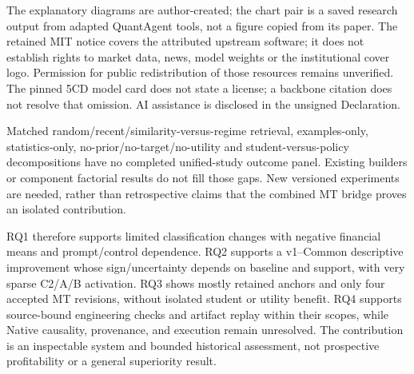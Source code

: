 The explanatory diagrams are author-created; the chart pair is a saved
research output from adapted QuantAgent tools, not a figure copied from
its paper. The retained MIT notice covers the attributed upstream
software; it does not establish rights to market data, news, model
weights or the institutional cover logo. Permission for public
redistribution of those resources remains unverified. The pinned 5CD
model card does not state a license; a backbone citation does not resolve
that omission. AI assistance is disclosed in the unsigned Declaration.

Matched random/recent/similarity-versus-regime retrieval, examples-only,
statistics-only, no-prior/no-target/no-utility and student-versus-policy
decompositions have no completed unified-study outcome panel. Existing
builders or component factorial results do not fill those gaps. New
versioned experiments are needed, rather than retrospective claims that
the combined MT bridge proves an isolated contribution.

RQ1 therefore supports limited classification changes with negative
financial means and prompt/control dependence. RQ2 supports a v1--Common
descriptive improvement whose sign/uncertainty depends on baseline and
support, with very sparse C2/A/B activation. RQ3 shows mostly retained
anchors and only four accepted MT revisions, without isolated student
or utility benefit. RQ4 supports source-bound engineering checks and
artifact replay within their scopes, while Native causality, provenance,
and execution remain unresolved. The contribution is an
inspectable system and bounded historical assessment, not prospective
profitability or a general superiority result.
